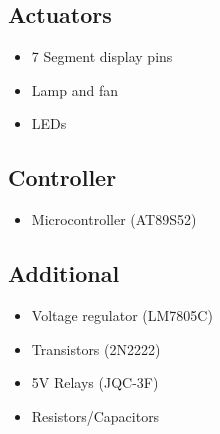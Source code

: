 \documentclass[11pt]{article}
\begin{document}
\subsection*{Actuators}
\begin{itemize}
	\setlength\itemsep{-2px}
    \item 7 Segment display pins
    \item Lamp and fan
    \item LEDs
\end{itemize}

\subsection*{Controller}
\begin{itemize}
	\setlength\itemsep{-2px}
    \item Microcontroller (AT89S52)
\end{itemize}

\subsection*{Additional}
\begin{itemize}
	\setlength\itemsep{-2px}
    \item Voltage regulator (LM7805C)
    \item Transistors (2N2222) 
    \item 5V Relays (JQC-3F)
    \item Resistors/Capacitors

\end{itemize}
	
\end{document}
